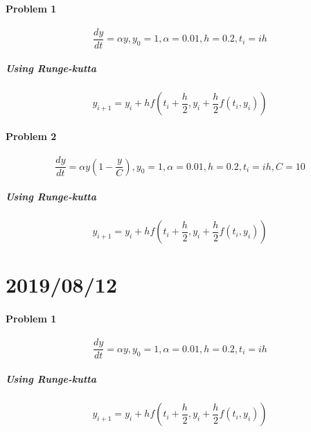 \documentclass{article}
\begin{document}
\paragraph{Problem 1}
 \[
    \frac{dy}{dt} = \alpha y, y_{0} = 1, \alpha = 0.01, h=0.2, t_i = ih
 \]
 
 \subparagraph{Using Runge-kutta}
 \[
    y_{i+1} = y_i + hf(t_i+\frac{h}{2}, y_i + \frac{h}{2} f(t_i, y_i))
 \]
 
 \paragraph{Problem 2}
 \[
    \frac{dy}{dt} = \alpha y\left(1 - \frac{y}{C}\right) , y_{0} = 1, \alpha = 0.01, h = 0.2, t_i = ih, C = 10
 \]
 
 \subparagraph{Using Runge-kutta}
 \[
    y_{i+1} = y_i + hf(t_i+\frac{h}{2}, y_i + \frac{h}{2} f(t_i, y_i))
 \]

\newpage

\section{2019/08/12}

\paragraph{Problem 1}
 \[
    \frac{dy}{dt} = \alpha y, y_{0} = 1, \alpha = 0.01, h=0.2, t_i = ih
 \]
 
 \subparagraph{Using Runge-kutta}
 \[
    y_{i+1} = y_i + hf(t_i+\frac{h}{2}, y_i + \frac{h}{2} f(t_i, y_i))
 \]
 
\end{document}
